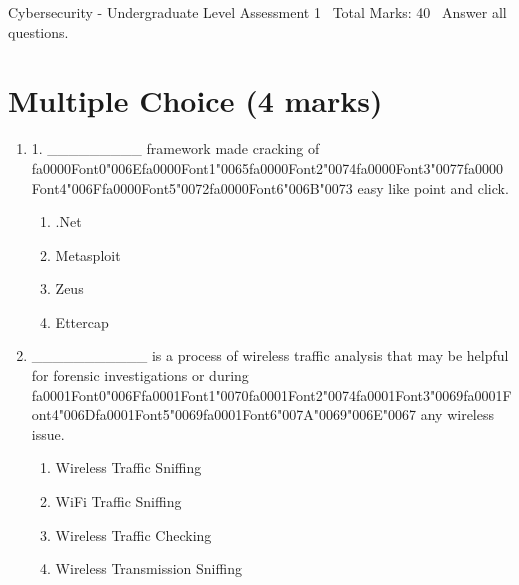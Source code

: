 \documentclass[12pt]{article}
\begin{document}
\begin{center}
Cybersecurity - Undergraduate Level Assessment 1 \
Total Marks: 40 \
Answer all questions.
\end{center}

\section*{Multiple Choice (4 marks)}
\begin{enumerate}[label=\arabic*.]
\item 1. \_\_\_\_\_\_\_\_\_ framework made cracking of {\csname fa0000Font0\endcsname\char"006E}{\csname fa0000Font1\endcsname\char"0065}{\csname fa0000Font2\endcsname\char"0074}{\csname fa0000Font3\endcsname\char"0077}{\csname fa0000Font4\endcsname\char"006F}{\csname fa0000Font5\endcsname\char"0072}{\csname fa0000Font6\endcsname\char"006B}{\char"0073} easy like point and click.
\begin{enumerate}[label=(\alph*)]
    \item .Net
    \item Metasploit
    \item Zeus
    \item Ettercap
\end{enumerate}
\item \_\_\_\_\_\_\_\_\_\_\_ is a process of wireless traffic analysis that may be helpful for forensic investigations or during {\csname fa0001Font0\endcsname\char"006F}{\csname fa0001Font1\endcsname\char"0070}{\csname fa0001Font2\endcsname\char"0074}{\csname fa0001Font3\endcsname\char"0069}{\csname fa0001Font4\endcsname\char"006D}{\csname fa0001Font5\endcsname\char"0069}{\csname fa0001Font6\endcsname\char"007A}{\char"0069}{\char"006E}{\char"0067} any wireless issue.
\begin{enumerate}[label=(\alph*)]
    \item Wireless Traffic Sniffing
    \item WiFi Traffic Sniffing
    \item Wireless Traffic Checking
    \item Wireless Transmission Sniffing
\end{enumerate}
\end{enumerate}
\end{document}
